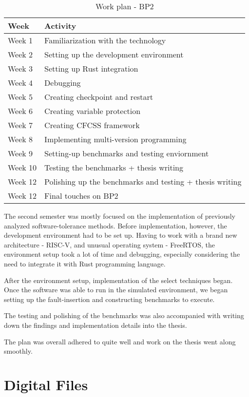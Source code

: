 \documentclass[12pt, letterpaper, slovak]{article}
\begin{document}
\begin{appendices}
\newpage

\begin{table}[!h]
\centering
\begin{tabular}{|l|l|}
\hline
\textbf{Week} & \textbf{Activity} \\
\hline
Week 1 & Familiarization with the technology \\
Week 2 & Setting up the development environment \\
Week 3 & Setting up Rust integration \\
Week 4 & Debugging \\
Week 5 & Creating checkpoint and restart  \\
Week 6 & Creating variable protection  \\
Week 7 & Creating CFCSS framework \\
Week 8 & Implementing multi-version programming \\
Week 9 & Setting-up benchmarks and testing enviornment \\
Week 10 & Testing the benchmarks + thesis writing \\
Week 12 & Polishing up the benchmarks and testing + thesis writing \\
Week 12 & Final touches on BP2 \\
\hline
\end{tabular}
\caption{Work plan - BP2}
\label{tab:work_plan_bp2}
\end{table}

The second semester was mostly focused on the implementation of previously analyzed software-tolerance methods. Before implementation, however, the development environment had to be set up. Having to work with a brand new architecture - RISC-V, and unusual operating system - FreeRTOS, the environment setup took a lot of time and debugging, especially considering the need to integrate it with Rust programming language.

After the environment setup, implementation of the select techniques began. Once the software was able to run in the simulated environment, we began setting up the fault-insertion and constructing benchmarks to execute.

The testing and polishing of the benchmarks was also accompanied with writing down the findings and implementation details into the thesis.

The plan was overall adhered to quite well and work on the thesis went along smoothly.

\clearpage
\section{Digital Files}


\end{appendices}
\end{document}
